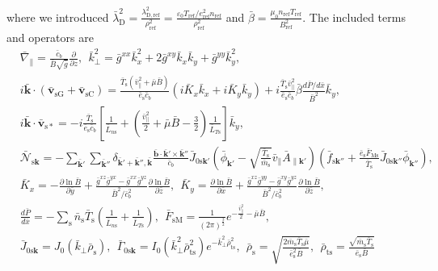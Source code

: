 where we introduced $\bar{\lambda}_\mathrm{D}^2 = \frac{\lambda_\mathrm{D,ref}^2}{\rho_\mathrm{ref}^2} = \frac{\varepsilon_0 T_\mathrm{ref}/e_\mathrm{ref}^2n_\mathrm{ref}}{\rho_\mathrm{ref}^2}$ and $\bar{\beta} = \frac{\mu_0 n_\mathrm{ref} T_\mathrm{ref}}{B_\mathrm{ref}^2}$. The included terms and operators are
\begin{align}
  &\bar{\nabla}_\parallel = \frac{\bar{c}_b}{\bar{B} \sqrt{\bar{g}}} \frac{\partial}{\partial z},~~
  \bar{k}_\perp^2 = \bar{g}^{xx} \bar{k}_x^2 + 2 \bar{g}^{xy} \bar{k}_x \bar{k}_y + \bar{g}^{yy} \bar{k}_y^2, \nonumber \\
  &i \bar{\bm{k}} \cdot (\bar{\bm{v}}_\mathrm{sG} + \bar{\bm{v}}_\mathrm{sC}) = \frac{\bar{T}_\mathrm{s} (\bar{v}_\parallel^2 + \bar{\mu} \bar{B})}{\bar{e}_\mathrm{s} \bar{c}_b} \left( i \bar{K}_x \bar{k}_x + i \bar{K}_y \bar{k}_y \right) + i \frac{\bar{T}_\mathrm{s} \bar{v}_\parallel^2}{\bar{e}_\mathrm{s} \bar{c}_b} \bar{\beta} \frac{d\bar{P}/d\bar{x}}{\bar{B}^2} \bar{k}_y, \nonumber \\
  &i \bar{\bm{k}} \cdot \bar{\bm{v}}_\mathrm{s*} = - i \frac{\bar{T}_\mathrm{s}}{\bar{e}_\mathrm{s} \bar{c}_b} \left[ \frac{1}{\bar{L}_{n\mathrm{s}}} + \left( \frac{\bar{v}_\parallel^2}{2} + \bar{\mu} \bar{B} - \frac{3}{2} \right) \frac{1}{\bar{L}_{T\mathrm{s}}} \right] \bar{k}_y, \nonumber \\
  &\bar{\mathcal{N}}_{\mathrm{s}\bm{k}} = - \sum_{\bar{\bm{k}}'} \sum_{\bar{\bm{k}}''} \delta_{\bar{\bm{k}}'+\bar{\bm{k}}'',\bar{\bm{k}}}\frac{\bar{\bm{b}} \cdot \bar{\bm{k}}' \times \bar{\bm{k}}''}{\bar{c}_b} \bar{J}_{0\mathrm{s}\bm{k}'} \left( \bar{\phi}_{\bm{k}'} - \sqrt{\frac{\bar{T}_\mathrm{s}}{\bar{m}_\mathrm{s}}} \bar{v}_\parallel \bar{A}_{\parallel\bm{k}'} \right) \left( \bar{f}_{\mathrm{s}\bm{k}''} + \frac{\bar{e}_\mathrm{s} \bar{F}_\mathrm{Ms}}{\bar{T}_\mathrm{s}} \bar{J}_{0\mathrm{s}\bm{k}''} \bar{\phi}_{\bm{k}''} \right), \nonumber \\
  &\bar{K}_x = - \frac{\partial \ln \bar{B}}{\partial \bar{y}} + \frac{\bar{g}^{xz} \bar{g}^{yx} - \bar{g}^{xx} \bar{g}^{yz}}{\bar{B}^2/\bar{c}_b^2} \frac{\partial \ln \bar{B}}{\partial \bar{z}},~~
  \bar{K}_y = \frac{\partial \ln \bar{B}}{\partial \bar{x}} + \frac{\bar{g}^{xz} \bar{g}^{yy} - \bar{g}^{xy} \bar{g}^{yz}}{\bar{B}^2/\bar{c}_b^2} \frac{\partial \ln \bar{B}}{\partial \bar{z}}, \nonumber \\
  &\frac{d\bar{P}}{d\bar{x}} = - \sum_\mathrm{s} \bar{n}_\mathrm{s} \bar{T}_\mathrm{s} \left( \frac{1}{\bar{L}_{n\mathrm{s}}} + \frac{1}{\bar{L}_{T\mathrm{s}}} \right),~~
  \bar{F}_\mathrm{sM} = \frac{1}{(2\pi)^\frac{3}{2}} e^{-\frac{\bar{v}_\parallel^2}{2}-\bar{\mu}\bar{B}}, \nonumber \\
  &\bar{J}_{0\mathrm{s}\bm{k}} = J_0 \left( \bar{k}_\perp \bar{\rho}_\mathrm{s} \right),~~
  \bar{\Gamma}_{0\mathrm{s}\bm{k}} = I_0 \left( \bar{k}_\perp^2 \bar{\rho}_\mathrm{ts}^2 \right) e^{- \bar{k}_\perp^2 \bar{\rho}_\mathrm{ts}^2},~~
  \bar{\rho}_\mathrm{s} = \sqrt{\frac{2\bar{m}_\mathrm{s}\bar{T}_\mathrm{s}\bar{\mu}}{\bar{e}_\mathrm{s}^2\bar{B}}},~~
  \bar{\rho}_\mathrm{ts} = \frac{\sqrt{\bar{m}_\mathrm{s}\bar{T}_\mathrm{s}}}{\bar{e}_\mathrm{s}\bar{B}}
\end{align}
